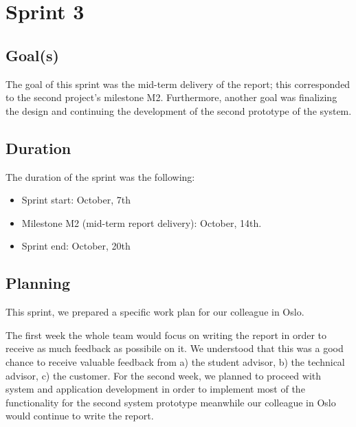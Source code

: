 
\chapter{Sprint 3}
\label{Sprint3}

\section{Goal(s)}

The goal of this sprint was the mid-term delivery of the report; this corresponded to
the second project's milestone M2. Furthermore, another goal was finalizing the design and continuing
the development of the second prototype of the system.%

\section{Duration}
The duration of the sprint was the following:
\begin{itemize}
\item Sprint start:  October, 7th
\item Milestone M2 (mid-term report delivery): October, 14th.
\item Sprint end: October, 20th
\end{itemize}

\section{Planning}

This sprint, we prepared a specific work plan for our colleague in Oslo.

The first week the whole team would focus on writing the report
in order to receive as much feedback as possibile on it. We understood that this was a good chance
to receive valuable feedback from a) the student advisor, b) the technical advisor, c) the customer.
For the second week, %
we planned to proceed with system and application development %
in order to implement most of the functionality for the second system prototype meanwhile
our colleague in Oslo would continue to write the report.

